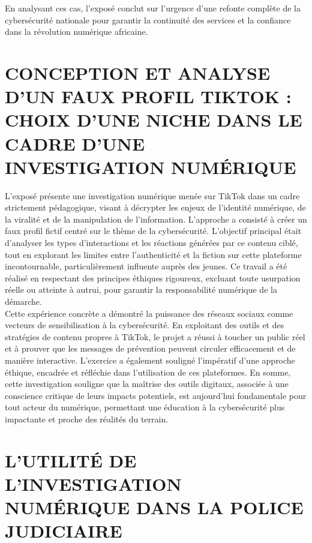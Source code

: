 \documentclass[12pt, openany]{report}
\begin{document}
En analysant ces cas, l'exposé conclut sur l'urgence d'une refonte complète de la cybersécurité nationale pour garantir la continuité des services et la confiance dans la révolution numérique africaine.

\section{CONCEPTION ET ANALYSE D’UN FAUX PROFIL
TIKTOK : CHOIX D’UNE NICHE DANS LE CADRE
D’UNE INVESTIGATION NUMÉRIQUE}

L'exposé présente une investigation numérique menée sur TikTok dans un cadre strictement pédagogique, visant à décrypter les enjeux de l'identité numérique, de la viralité et de la manipulation de l'information. L'approche a consisté à créer un faux profil fictif centré sur le thème de la cybersécurité. L'objectif principal était d'analyser les types d'interactions et les réactions générées par ce contenu ciblé, tout en explorant les limites entre l'authenticité et la fiction sur cette plateforme incontournable, particulièrement influente auprès des jeunes. Ce travail a été réalisé en respectant des principes éthiques rigoureux, excluant toute usurpation réelle ou atteinte à autrui, pour garantir la responsabilité numérique de la démarche.\\

Cette expérience concrète a démontré la puissance des réseaux sociaux comme vecteurs de sensibilisation à la cybersécurité. En exploitant des outils et des stratégies de contenu propres à TikTok, le projet a réussi à toucher un public réel et à prouver que les messages de prévention peuvent circuler efficacement et de manière interactive. L'exercice a également souligné l'impératif d'une approche éthique, encadrée et réfléchie dans l'utilisation de ces plateformes. En somme, cette investigation souligne que la maîtrise des outils digitaux, associée à une conscience critique de leurs impacts potentiels, est aujourd'hui fondamentale pour tout acteur du numérique, permettant une éducation à la cybersécurité plus impactante et proche des réalités du terrain.
\newpage
\section{L’UTILITÉ DE L’INVESTIGATION
NUMÉRIQUE DANS LA POLICE JUDICIAIRE}
\end{document}
